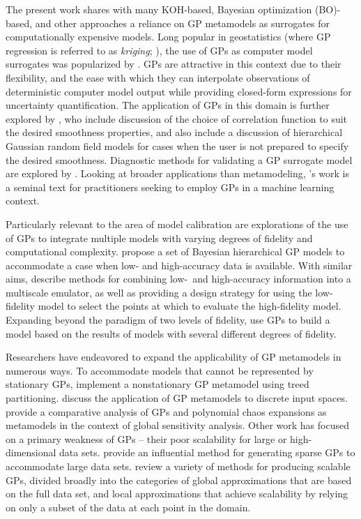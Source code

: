 \documentclass[12pt]{article}
\begin{document}
The present work shares with many KOH-based, Bayesian optimization (BO)-based, and other approaches a reliance on GP metamodels as surrogates for computationally expensive models.
Long popular in geostatistics (where GP regression is referred to as \textit{kriging}; \cite{Cressie2015}), the use of GPs as computer model surrogates was popularized by \citet{Sacks1989}.
GPs are attractive in this context due to their flexibility, and the ease with which they can interpolate observations of deterministic computer model output while providing closed-form expressions for uncertainty quantification.
The application of GPs in this domain is further explored by \citet{Santner2003a}, who include discussion of the choice of correlation function to suit the desired smoothness properties, and also include a discussion of hierarchical Gaussian random field models for cases when the user is not prepared to specify the desired smoothness.
Diagnostic methods for validating a GP surrogate model are explored by \citet{Bastos2009}.
Looking at broader applications than metamodeling, \citeauthor{Rasmussen2006}'s \citeyearpar{Rasmussen2006} work is a seminal text for practitioners seeking to employ GPs in a machine learning context.

Particularly relevant to the area of model calibration are explorations of the use of GPs to integrate multiple models with varying degrees of fidelity and computational complexity.
\citet{Qian2008a} propose a set of Bayesian hierarchical GP models to accommodate a case when low- and high-accuracy data is available.
With similar aims, \citet{Cumming2009} describe methods for combining low-\ and high-accuracy information into a multiscale emulator, as well as providing a design strategy for using the low-fidelity model to select the points at which to evaluate the high-fidelity model.
Expanding beyond the paradigm of two levels of fidelity, \citet{Goh2013} use GPs to build a model based on the results of models with several different degrees of fidelity.

Researchers have endeavored to expand the applicability of GP metamodels in numerous ways.
To accommodate models that cannot be represented by stationary GPs, \cite{Gramacy2008} implement a nonstationary GP metamodel using treed partitioning.
\citet{Qian2008} discuss the application of GP metamodels to discrete input spaces.
\citet{Gratiet2016} provide a comparative analysis of GPs and polynomial chaos expansions as metamodels in the context of global sensitivity analysis.
Other work has focused on a primary weakness of GPs -- their poor scalability for large or high-dimensional data sets.
\citet{Snelson2006} provide an influential method for generating sparse GPs to accommodate large data sets.
\citet{Liu2020} review a variety of methods for producing scalable GPs, divided broadly into the categories of global approximations that are based on the full data set, and local approximations that achieve scalability by relying on only a subset of the data at each point in the domain.
\end{document}
